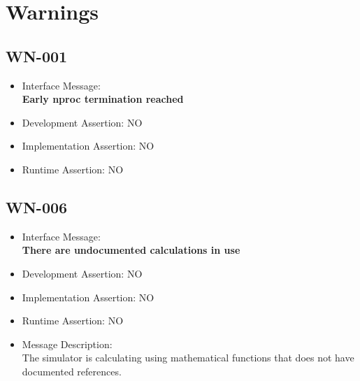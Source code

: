 \section{Warnings}

\subsection{WN-001}
\begin{itemize}
  \item Interface Message:\\[1em]
    \textbf{Early nproc termination reached}
  \item Development Assertion: NO
  \item Implementation Assertion: NO
  \item Runtime Assertion: NO
\end{itemize}

\subsection{WN-006}
\begin{itemize}
  \item Interface Message:\\[1em]
    \textbf{There are undocumented calculations in use}
  \item Development Assertion: NO
  \item Implementation Assertion: NO
  \item Runtime Assertion: NO
  \item Message Description:\\[1em]
    The simulator is calculating using mathematical functions that does not have documented references.
\end{itemize}

